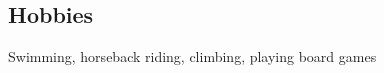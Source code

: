 \documentclass[../main.tex]{subfiles}
\begin{document}
\begin{category}
\section{Hobbies}
    \citembullet Swimming, horseback riding, climbing, playing board games 
\end{category}
\end{document}
